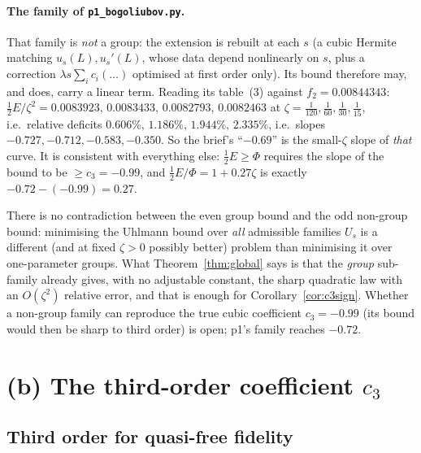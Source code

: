 \documentclass[11pt]{article}
\begin{document}
\paragraph{The family of \texttt{p1\_bogoliubov.py}.}  That family is \emph{not} a group: the
extension is rebuilt at each $s$ (a cubic Hermite matching $u_s(L),u_s'(L)$, whose data depend
nonlinearly on $s$, plus a correction $\lambda s\sum_ic_i(\dots)$ optimised at first order only).
Its bound therefore may, and does, carry a linear term.  Reading its table~(3) against
$f_2=0.00844343$: $\frac12E/\zeta^2=0.0083923,\,0.0083433,\,0.0082793,\,0.0082463$ at
$\zeta=\frac1{120},\frac1{60},\frac1{30},\frac1{15}$, i.e.\ relative deficits
$0.606\%,\,1.186\%,\,1.944\%,\,2.335\%$, i.e.\ slopes $-0.727,-0.712,-0.583,-0.350$.  So the
brief's ``$-0.69$'' is the small-$\zeta$ slope of \emph{that} curve.  It is consistent with
everything else: $\frac12E\ge\Phi$ requires the slope of the bound to be $\ge c_3=-0.99$, and
$\frac12E/\Phi=1+0.27\zeta$ is exactly $-0.72-(-0.99)=0.27$.

\begin{verdictgap}
There is no contradiction between the even group bound and the odd non-group bound: minimising the
Uhlmann bound over \emph{all} admissible families $U_s$ is a different (and at fixed $\zeta>0$
possibly better) problem than minimising it over one-parameter groups.  What
Theorem~\ref{thm:global} says is that the \emph{group} sub-family already gives, with no
adjustable constant, the sharp quadratic law with an $O(\zeta^2)$ relative error, and that is
enough for Corollary~\ref{cor:c3sign}.  Whether a non-group family can reproduce the true cubic
coefficient $c_3=-0.99$ (its bound would then be sharp to third order) is open; p1's family reaches
$-0.72$.
\end{verdictgap}

\section{(b) The third-order coefficient $c_3$}\label{sec:b}

\subsection{Third order for quasi-free fidelity}
\end{document}
